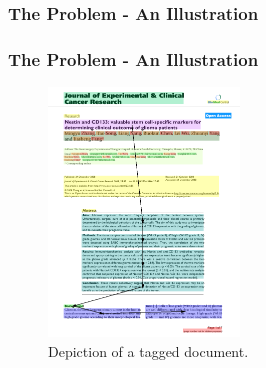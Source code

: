 \documentclass{beamer}
\begin{document}
\begin{frame}
\frametitle{The Problem - An Illustration}
\begin{figure}[!t]
\center
{}
{}
\end{figure}
\end{frame}


\begin{frame}
\frametitle{The Problem - An Illustration}
\begin{figure}[!ht]
\center
\includegraphics[width=2in]{figures/tagging.png}
\caption{Depiction of a tagged document.}
\end{figure}
\end{frame}
\end{document}
